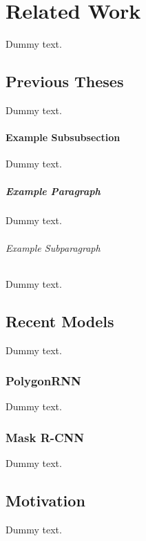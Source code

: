 \chapter{Related Work}

Dummy text.

\section{Previous Theses}

Dummy text.

\subsubsection{Example Subsubsection}

Dummy text.

\paragraph{Example Paragraph}

Dummy text.

\subparagraph{Example Subparagraph}

Dummy text.

\section{Recent Models}

Dummy text.

\subsection{PolygonRNN}

Dummy text.

\subsection{Mask R-CNN}

Dummy text.

\section{Motivation}

Dummy text.
